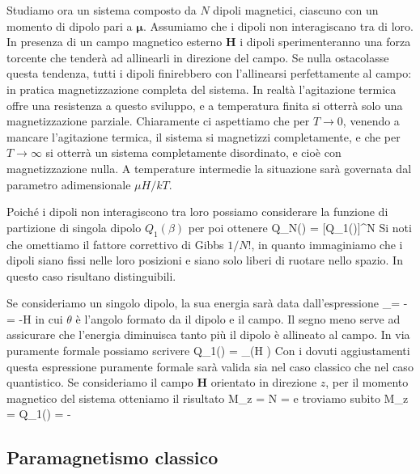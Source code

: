 Studiamo ora un sistema composto da $N$ dipoli magnetici, ciascuno con un momento di dipolo pari a $\pmb{\mu}$. Assumiamo che i dipoli non interagiscano tra di loro. In presenza di un campo magnetico esterno $\mathbf{H}$ i dipoli sperimenteranno una forza torcente che tenderà ad allinearli in direzione del campo. Se nulla ostacolasse questa tendenza, tutti i dipoli finirebbero con l'allinearsi perfettamente al campo: in pratica magnetizzazione completa del sistema. In realtà l'agitazione termica offre una resistenza a questo sviluppo, e a temperatura finita si otterrà solo una magnetizzazione parziale. Chiaramente ci aspettiamo che per $T\to 0$, venendo a mancare l'agitazione termica, il sistema si magnetizzi completamente, e che per $T\to\infty$ si otterrà un sistema completamente disordinato, e cioè con magnetizzazione nulla. A temperature intermedie la situazione sarà governata dal parametro adimensionale $\mu H/kT$.

Poiché i dipoli non interagiscono tra loro possiamo considerare la funzione di partizione di singola dipolo $Q_1(\beta)$ per poi ottenere
\be
Q_N(\beta) = [Q_1(\beta)]^N
\ee
Si noti che omettiamo il fattore correttivo di Gibbs $1/N!$, in quanto immaginiamo che i dipoli siano fissi nelle loro posizioni e siano solo liberi di ruotare nello spazio. In questo caso risultano distinguibili.

Se consideriamo un singolo dipolo, la sua energia sarà data dall'espressione
\be
\epsilon_\theta = -\pmb{\mu}\cdot{} = -\mu H\cos\theta
\ee
in cui $\theta$ è l'angolo formato da il dipolo e il campo. Il segno meno serve ad assicurare che l'energia diminuisca tanto più il dipolo è allineato al campo. In via puramente formale possiamo scrivere
\be
Q_1(\beta) = \sum_\theta\exp(\beta\mu H \cos\theta)
\ee
Con i dovuti aggiustamenti questa espressione puramente formale sarà valida sia nel caso classico che nel caso quantistico. Se consideriamo il campo $\mathbf{H}$ orientato in direzione $z$, per il momento magnetico del sistema otteniamo il risultato
\be
M_z = N\aspetta{\mu\cos\theta} = 
\ee
e troviamo subito
\be
M_z = \ln Q_1(\beta) = -
\ee


\subsection{Paramagnetismo classico}

